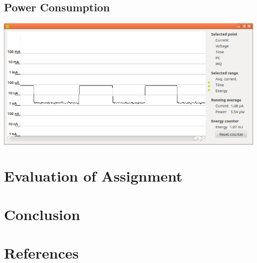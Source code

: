 \documentclass[a4paper, 12pt]{article}
\begin{document}
	\subsection{Power Consumption} %
	\label{sub:power_consumption}
		\includegraphics{eaprofiler}

\section{Evaluation of Assignment} %
\label{sec:evaluation_of_assignment}


\section{Conclusion} %
\label{sec:conclusion}


\section{References} %
\label{sec:references}

\end{document}
